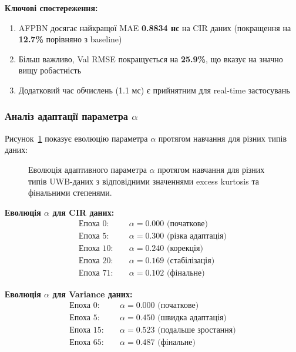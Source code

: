 \documentclass[12pt,a4paper]{article}
\begin{document}
\textbf{Ключові спостереження:}

\begin{enumerate}
	\item AFPBN досягає найкращої MAE \textbf{0.8834 нс} на CIR даних (покращення на \textbf{12.7\%} порівняно з baseline)
	\item Більш важливо, Val RMSE покращується на \textbf{25.9\%}, що вказує на значно вищу робастність
	\item Додатковий час обчислень (1.1 мс) є прийнятним для real-time застосувань
\end{enumerate}

\subsubsection{Аналіз адаптації параметра $\alpha$}

Рисунок~\ref{fig:alpha_evolution_detailed} показує еволюцію параметра $\alpha$ протягом навчання для різних типів даних:

\begin{figure}[htbp]
	\centering
	\caption{Еволюція адаптивного параметра $\alpha$ протягом навчання для різних типів UWB-даних з відповідними значеннями excess kurtosis та фінальними степенями.}
	\label{fig:alpha_evolution_detailed}
\end{figure}

\textbf{Еволюція $\alpha$ для CIR даних:}
\begin{align}
	\text{Епоха } 0: \quad &\alpha = 0.000 \text{ (початкове)} \\
	\text{Епоха } 5: \quad &\alpha = 0.300 \text{ (різка адаптація)} \\
	\text{Епоха } 10: \quad &\alpha = 0.240 \text{ (корекція)} \\
	\text{Епоха } 20: \quad &\alpha = 0.169 \text{ (стабілізація)} \\
	\text{Епоха } 71: \quad &\alpha = 0.102 \text{ (фінальне)}
\end{align}

\textbf{Еволюція $\alpha$ для Variance даних:}
\begin{align}
	\text{Епоха } 0: \quad &\alpha = 0.000 \text{ (початкове)} \\
	\text{Епоха } 5: \quad &\alpha = 0.450 \text{ (швидка адаптація)} \\
	\text{Епоха } 15: \quad &\alpha = 0.523 \text{ (подальше зростання)} \\
	\text{Епоха } 65: \quad &\alpha = 0.487 \text{ (фінальне)}
\end{align}
\end{document}
